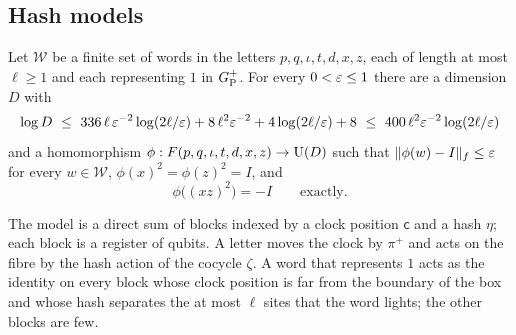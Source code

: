 \subsection{Hash models}\label{sec:upper-models}

\begin{proposition}\label{prop:hash-models}
Let $\mathcal W$ be a finite set of words in the letters $p,q,\iota,t,d,x,z$, each of length at most $\ell\ge1$ and each representing $1$
in $G_{\mathrm P}^{+}$. For every $0<\varepsilon\le1$ there are a dimension $D$ with
\[
\log D\ \le\ 336\,\ell\,\eps^{-2}\log(2\ell/\eps)+8\,\ell^2\eps^{-2}+4\log(2\ell/\eps)+8\ \le\ 400\,\ell^2\eps^{-2}\log(2\ell/\eps)
\]
and a homomorphism $\phi:F(p,q,\iota,t,d,x,z)\to\mathrm U(D)$ such that $\lVert \phi(w)-I\rVert_f\le\varepsilon$ for every $w\in\mathcal W$,
$\phi(x)^2=\phi(z)^2=I$, and
\[
\phi\bigl((xz)^2\bigr)=-I\qquad\text{exactly}.
\]
\end{proposition}

The model is a direct sum of blocks indexed by a clock position $\mathsf c$ and a hash $\eta$; each block is a register of qubits. A
letter moves the clock by $\pi^+$ and acts on the fibre by the hash action of the cocycle $\zeta$. A word that represents $1$ acts as the
identity on every block whose clock position is far from the boundary of the box and whose hash separates the at most $\ell$ sites that
the word lights; the other blocks are few.

